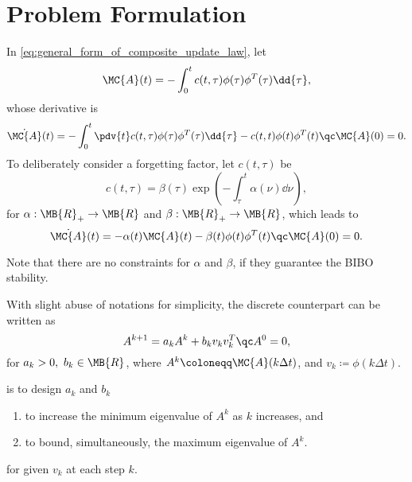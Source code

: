 \documentclass[nobib]{my-handout}
\theoremstyle{definition}
\theoremstyle{remark}
\begin{document}
\section{Problem Formulation}

In \eqref{eq:general_form_of_composite_update_law}, let
\begin{equation*}
	\MC{A}(t) = - \int_0^t c(t, \tau) \phi(\tau) \phi^T(\tau) \dd{\tau},
\end{equation*}
whose derivative is
\begin{equation*}
	\dot{\MC{A}}(t) = - \int_0^t \pdv{t} c(t, \tau) \phi(\tau) \phi^T(\tau)
	\dd{\tau} - c(t, t) \phi(t) \phi^T(t) \qc \MC{A}(0) = 0.
\end{equation*}
To deliberately consider a forgetting factor, let $c(t, \tau)$ be
\begin{equation*}
	c(t, \tau) = \beta(\tau) \exp(- \int_\tau^t \alpha(\nu) \dd{\nu}),
\end{equation*}
for $\alpha: \MB{R}_{+} \to \MB{R}$ and $\beta: \MB{R}_{+} \to \MB{R}$,
which leads to 
\begin{equation*}
	\dot{\MC{A}}(t) = - \alpha(t) \MC{A}(t) - \beta(t) \phi(t) \phi^T(t) \qc
	\MC{A}(0) = 0.
\end{equation*}

Note that there are no constraints for $\alpha$ and $\beta$, if they guarantee
the BIBO stability.

With slight abuse of notations for simplicity, the discrete counterpart can be
written as
\begin{equation}\label{eq:discrete_update_law}
	A^{k+1} = a_k A^k + b_k v_k v_k^T \qc A^0 = 0,
\end{equation}
for $a_k > 0,\ b_k \in \MB{R}$, where $A^k \coloneqq \MC{A}(k \Delta t)$, and $v_k
\coloneqq \phi(k \Delta t)$.

 is to design $a_k$ and $b_k$
\begin{enumerate}
	\item to increase the minimum eigenvalue of $A^k$ as $k$ increases, and
	\item to bound, simultaneously, the maximum eigenvalue of $A^k$.
\end{enumerate}
for given $v_k$ at each step $k$.
\end{document}
